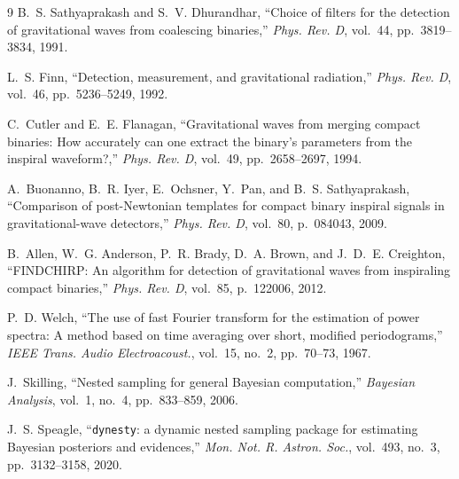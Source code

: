\documentclass[11pt,a4paper]{article}
\begin{document}
\begin{thebibliography}{9}
B.~S. Sathyaprakash and S.~V. Dhurandhar, ``Choice of filters for the detection of gravitational waves from coalescing binaries,'' \emph{Phys. Rev. D}, vol.~44, pp.~3819--3834, 1991.

L.~S. Finn, ``Detection, measurement, and gravitational radiation,'' \emph{Phys. Rev. D}, vol.~46, pp.~5236--5249, 1992.

C.~Cutler and E.~E. Flanagan, ``Gravitational waves from merging compact binaries: How accurately can one extract the binary's parameters from the inspiral waveform?,'' \emph{Phys. Rev. D}, vol.~49, pp.~2658--2697, 1994.

A.~Buonanno, B.~R. Iyer, E.~Ochsner, Y.~Pan, and B.~S. Sathyaprakash, ``Comparison of post-Newtonian templates for compact binary inspiral signals in gravitational-wave detectors,'' \emph{Phys. Rev. D}, vol.~80, p.~084043, 2009.

B.~Allen, W.~G. Anderson, P.~R. Brady, D.~A. Brown, and J.~D.~E. Creighton, ``FINDCHIRP: An algorithm for detection of gravitational waves from inspiraling compact binaries,'' \emph{Phys. Rev. D}, vol.~85, p.~122006, 2012.

P.~D. Welch, ``The use of fast Fourier transform for the estimation of power spectra: A method based on time averaging over short, modified periodograms,'' \emph{IEEE Trans. Audio Electroacoust.}, vol.~15, no.~2, pp.~70--73, 1967.

J.~Skilling, ``Nested sampling for general Bayesian computation,'' \emph{Bayesian Analysis}, vol.~1, no.~4, pp.~833--859, 2006.

J.~S. Speagle, ``\texttt{dynesty}: a dynamic nested sampling package for estimating Bayesian posteriors and evidences,'' \emph{Mon. Not. R. Astron. Soc.}, vol.~493, no.~3, pp.~3132--3158, 2020.
\end{thebibliography}
\end{document}
